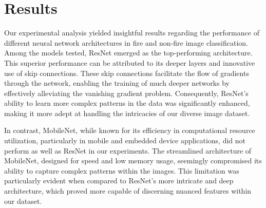 \section{Results}

\begin{center}
\end{center}


Our experimental analysis yielded insightful results regarding the performance of different neural network architectures in fire and non-fire image classification. Among the models tested, ResNet emerged as the top-performing architecture. This superior performance can be attributed to its deeper layers and innovative use of skip connections. These skip connections facilitate the flow of gradients through the network, enabling the training of much deeper networks by effectively alleviating the vanishing gradient problem. Consequently, ResNet's ability to learn more complex patterns in the data was significantly enhanced, making it more adept at handling the intricacies of our diverse image dataset.

In contrast, MobileNet, while known for its efficiency in computational resource utilization, particularly in mobile and embedded device applications, did not perform as well as ResNet in our experiments. The streamlined architecture of MobileNet, designed for speed and low memory usage, seemingly compromised its ability to capture complex patterns within the images. This limitation was particularly evident when compared to ResNet's more intricate and deep architecture, which proved more capable of discerning nuanced features within our dataset.

